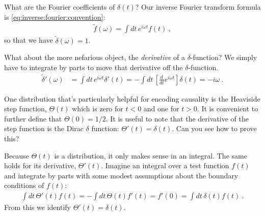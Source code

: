 \begin{example}
What are the Fourier coefficients of $\delta(t)$? Our inverse Fourier transform formula is \eqref{eq:inverse:fourier:convention}:
\begin{align}
	\tilde f(\omega) = \int dt\, e^{i\omega t} f(t) \ ,
\end{align}
so that we have $\tilde\delta(\omega) = 1$.
\end{example}

\begin{example}
What about the more nefarious object, the \emph{derivative} of a $\delta$-function? We simply have to integrate by parts to move that derivative off the $\delta$-function. 
\begin{align}
	\tilde \delta'(\omega) &= \int dt\, e^{i\omega t} \delta'(t)
	= -\int dt\, \left[\frac{d}{dt}e^{i\omega t}\right] \delta(t)
	= - i\omega \ .
\end{align}
\end{example}

One distribution that's particularly helpful for encoding causality is the Heaviside step function, $\Theta(t)$ which is zero for $t<0$ and one for $t>0$. It is convenient to further define that $\Theta(0) = 1/2$. It is useful to note that the derivative of the step function is the Dirac $\delta$ function: $\Theta'(t) = \delta(t)$. Can you see how to prove this?
\begin{example}
Because $\Theta(t)$ is a distribution, it only makes sense in an integral. The same holds for its derivative, $\Theta'(t)$. Imagine an integral over a test function $f(t)$ and integrate by parts with some modest assumptions about the boundary conditions of $f(t)$:
\begin{align}
	\int dt\, \Theta'(t) f(t) = - \int dt\, \Theta(t) f'(t)
	= f'(0) = \int dt\, \delta(t) f(t) \ . 
\end{align}
From this we identify $\Theta'(t) = \delta(t)$.
\end{example}

